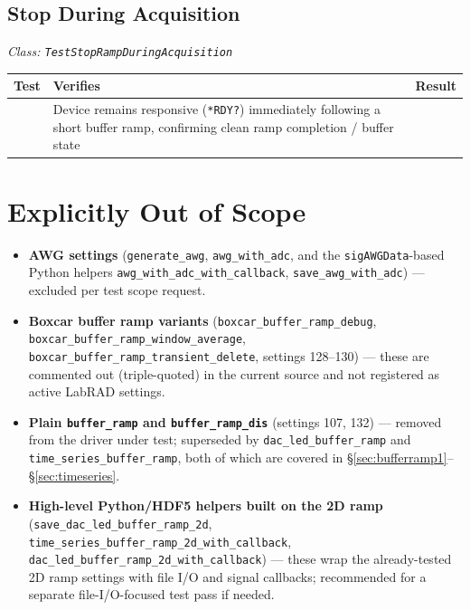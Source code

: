 \documentclass[11pt]{article}
\begin{document}
\subsection{Stop During Acquisition}
\label{sec:stopduring}

\noindent\textit{Class: \texttt{TestStopRampDuringAcquisition}}

\begin{longtable}{T{4.6cm}L{8.4cm}L{1.5cm}}
\toprule
\textbf{Test} & \textbf{Verifies} & \textbf{Result} \\
\midrule
\endhead
{} & Device remains responsive (\texttt{*RDY?}) immediately following a short buffer ramp, confirming clean ramp completion / buffer state & \\
\bottomrule
\end{longtable}

\section{Explicitly Out of Scope}

\begin{itemize}[leftmargin=1.4em]
  \item \textbf{AWG settings} (\texttt{generate\_awg}, \texttt{awg\_with\_adc}, and the \texttt{sigAWGData}-based Python helpers \texttt{awg\_with\_adc\_with\_callback}, \texttt{save\_awg\_with\_adc}) --- excluded per test scope request.
  \item \textbf{Boxcar buffer ramp variants} (\texttt{boxcar\_buffer\_ramp\_debug}, \texttt{boxcar\_buffer\_ramp\_window\_average}, \texttt{boxcar\_buffer\_ramp\_transient\_delete}, settings 128--130) --- these are commented out (triple-quoted) in the current source and not registered as active LabRAD settings.
  \item \textbf{Plain \texttt{buffer\_ramp} and \texttt{buffer\_ramp\_dis}} (settings 107, 132) --- removed from the driver under test; superseded by \texttt{dac\_led\_buffer\_ramp} and \texttt{time\_series\_buffer\_ramp}, both of which are covered in \S\ref{sec:bufferramp1}--\S\ref{sec:timeseries}.
  \item \textbf{High-level Python/HDF5 helpers built on the 2D ramp} (\texttt{save\_dac\_led\_buffer\_ramp\_2d}, \texttt{time\_series\_buffer\_ramp\_2d\_with\_callback}, \texttt{dac\_led\_buffer\_ramp\_2d\_with\_callback}) --- these wrap the already-tested 2D ramp settings with file I/O and signal callbacks; recommended for a separate file-I/O-focused test pass if needed.
\end{itemize}
\end{document}
